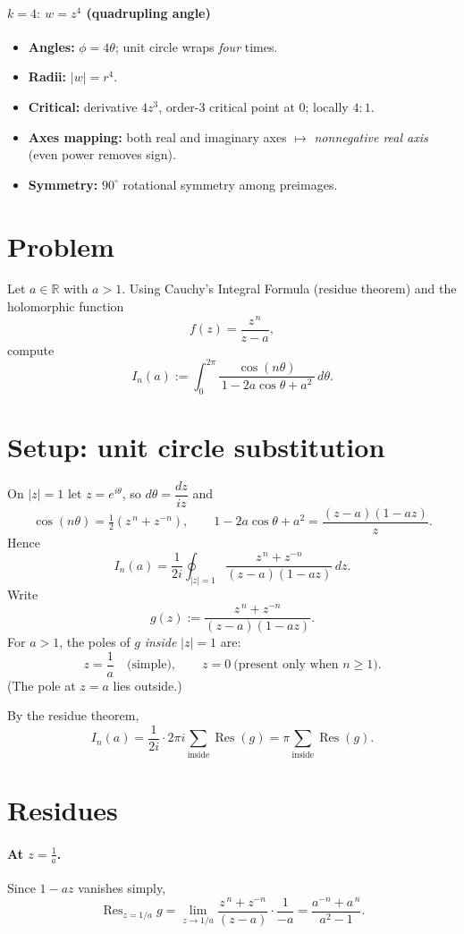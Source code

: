 \documentclass[11pt]{article}
\DeclareMathOperator{\Res}{Res}
\begin{document}
\paragraph{\(k=4:\ w=z^{4}\) (quadrupling angle)}
\begin{itemize}
	\item \textbf{Angles:} \(\phi=4\theta\); unit circle wraps \emph{four} times.
	\item \textbf{Radii:} \(|w|=r^{4}\).
	\item \textbf{Critical:} derivative \(4z^{3}\), order-\(3\) critical point at \(0\); locally \(4{:}1\).
	\item \textbf{Axes mapping:} both real and imaginary axes \(\mapsto\) \emph{nonnegative real axis} (even power removes sign).
	\item \textbf{Symmetry:} \(90^{\circ}\) rotational symmetry among preimages.
\end{itemize}


\section*{Problem}
Let $a\in\mathbb R$ with $a>1$. Using Cauchy’s Integral Formula (residue theorem) and
the holomorphic function
\[
f(z)=\frac{z^{\,n}}{z-a},
\]
compute
\[
I_n(a):=\int_0^{2\pi}\frac{\cos(n\theta)}{\,1-2a\cos\theta+a^2\,}\,d\theta .
\]

\section*{Setup: unit circle substitution}
On $|z|=1$ let $z=e^{i\theta}$, so $d\theta=\dfrac{dz}{iz}$ and
\[
\cos(n\theta)=\tfrac12\!\left(z^{\,n}+z^{-n}\right),\qquad
1-2a\cos\theta+a^2=\frac{(z-a)(1-az)}{z}.
\]
Hence
\[
I_n(a)
=\frac{1}{2i}\oint_{|z|=1}\frac{z^{\,n}+z^{-n}}{(z-a)(1-az)}\,dz.
\]
Write
\[
g(z):=\frac{z^{\,n}+z^{-n}}{(z-a)(1-az)}.
\]
For $a>1$, the poles of $g$ \emph{inside} $|z|=1$ are:
\[
z=\frac1a\quad\text{(simple)},\qquad
z=0\ \text{(present only when }n\ge1\text{)}.
\]
(The pole at $z=a$ lies outside.)

By the residue theorem,
\[
I_n(a)=\frac{1}{2i}\cdot 2\pi i\sum_{\text{inside}}\Res(g)=\pi\sum_{\text{inside}}\Res(g).
\]

\section*{Residues}
\paragraph{At $z=\tfrac1a$.}
Since $1-az$ vanishes simply,
\[
\Res_{z=1/a} g
=\lim_{z\to 1/a}\frac{z^{\,n}+z^{-n}}{(z-a)}\cdot\frac{1}{-a}
=\frac{a^{-n}+a^{\,n}}{a^2-1}.
\]
\end{document}
